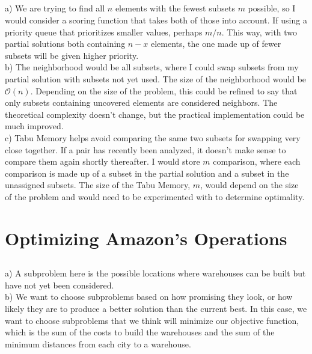 \documentclass{article}
\begin{document}
\subsection{}

a) We are trying to find all $n$ elements with the fewest subsets $m$ possible, so I would consider a scoring function that takes both of those into account. If using a priority queue that prioritizes smaller values, perhaps $m / n$. This way, with two partial solutions both containing $n-x$ elements, the one made up of fewer subsets will be given higher priority.\\

b) The neighborhood would be all subsets, where I could swap subsets from my partial solution with subsets not yet used. The size of the neighborhood would be $\mathcal{O}(n)$. Depending on the size of the problem, this could be refined to say that only subsets containing uncovered elements are considered neighbors. The theoretical complexity doesn't change, but the practical implementation could be much improved.\\

c) Tabu Memory helps avoid comparing the same two subsets for swapping very close together. If a pair has recently been analyzed, it doesn't make sense to compare them again shortly thereafter. I would store $m$ comparison, where each comparison is made up of a subset in the partial solution and a subset in the unassigned subsets. The size of the Tabu Memory, $m$, would depend on the size of the problem and would need to be experimented with to determine optimality.

\newpage
\section{Optimizing Amazon's Operations}

\subsection{}

a) A subproblem here is the possible locations where warehouses can be built but have not yet been considered.\\

b) We want to choose subproblems based on how promising they look, or how likely they are to produce a better solution than the current best. In this case, we want to choose subproblems that we think will minimize our objective function, which is the sum of the costs to build the warehouses and the sum of the minimum distances from each city to a warehouse.\\
\end{document}
